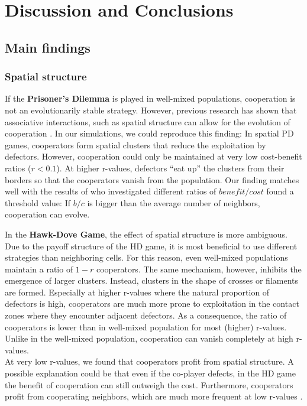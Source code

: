 \section{Discussion and Conclusions}

\subsection{Main findings}

\subsubsection*{Spatial structure}


If the \textbf{Prisoner's Dilemma} is played in well-mixed populations, cooperation is not an evolutionarily stable strategy. However, previous research has shown that associative interactions, such as spatial structure can allow for the evolution of cooperation \citep{nowak1992,doebeli1998evolution,killingback1999variable}. In our simulations, we could reproduce this finding: In spatial PD games, cooperators form spatial clusters that reduce the exploitation by defectors.
However, cooperation could only be maintained at very low cost-benefit ratios ($r<0.1$). At higher r-values, defectors ``eat up'' the clusters from their borders so that the cooperators vanish from the population. Our finding matches well with the results of \cite{ohtsuki2006simple} who investigated different ratios of $benefit / cost$ found a threshold value: If $b/c$ is bigger than the average number of neighbors, cooperation can evolve. 


In the \textbf{Hawk-Dove Game}, the effect of spatial structure is more ambiguous. Due to the payoff structure of the HD game, it is most beneficial to use different strategies than neighboring cells. For this reason, even well-mixed populations maintain a ratio of $1-r$ cooperators. The same mechanism, however, inhibits the emergence of larger clusters. Instead, clusters in the shape of crosses or filaments are formed. Especially at higher r-values where the natural proportion of defectors is high, cooperators are much more prone to exploitation in the contact zones where they encounter adjacent defectors. As a consequence, the ratio of cooperators is lower than in well-mixed population for most (higher) r-values. Unlike in the well-mixed population, cooperation can vanish completely at high r-values. \\
At very low r-values, we found that cooperators profit from spatial structure. A possible explanation could be that even if the co-player defects, in the HD game the benefit of cooperation can still outweigh the cost. Furthermore, cooperators profit from cooperating neighbors, which are much more frequent at low r-values \citep{HauertandDoebeli2004}. 



